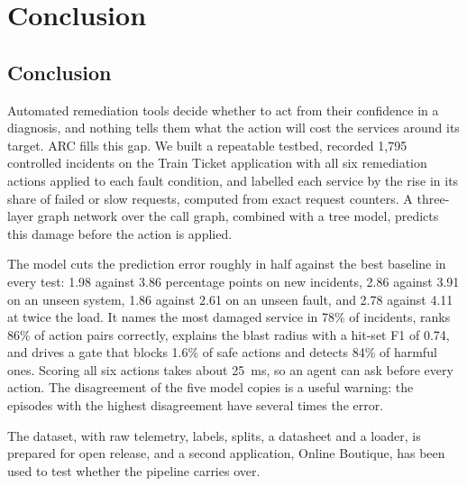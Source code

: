 \chapter{Conclusion}
\section{Conclusion}
Automated remediation tools decide whether to act from their confidence in a diagnosis, and nothing tells them what the action will cost the services around its target. ARC fills this gap. We built a repeatable testbed, recorded 1,795 controlled incidents on the Train Ticket application with all six remediation actions applied to each fault condition, and labelled each service by the rise in its share of failed or slow requests, computed from exact request counters. A three-layer graph network over the call graph, combined with a tree model, predicts this damage before the action is applied.

The model cuts the prediction error roughly in half against the best baseline in every test: 1.98 against 3.86 percentage points on new incidents, 2.86 against 3.91 on an unseen system, 1.86 against 2.61 on an unseen fault, and 2.78 against 4.11 at twice the load. It names the most damaged service in 78\% of incidents, ranks 86\% of action pairs correctly, explains the blast radius with a hit-set F1 of 0.74, and drives a gate that blocks 1.6\% of safe actions and detects 84\% of harmful ones. Scoring all six actions takes about 25~ms, so an agent can ask before every action. The disagreement of the five model copies is a useful warning: the episodes with the highest disagreement have several times the error.

The dataset, with raw telemetry, labels, splits, a datasheet and a loader, is prepared for open release, and a second application, Online Boutique, has been used to test whether the pipeline carries over.

